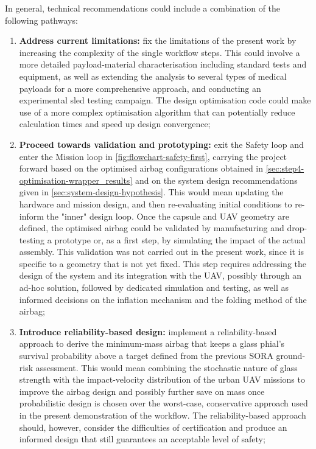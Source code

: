In general, technical recommendations could include a combination of the following pathways:
\begin{enumerate}
    \item \textbf{Address current limitations:} fix the limitations of the present work by increasing the complexity of the single workflow steps. This could involve a more detailed payload-material characterisation including standard tests and equipment, as well as extending the analysis to several types of medical payloads for a more comprehensive approach, and conducting an experimental sled testing campaign. The design optimisation code could make use of a more complex optimisation algorithm that can potentially reduce calculation times and speed up  design convergence;
    
    \item \textbf{Proceed towards validation and prototyping:} exit the Safety loop and enter the Mission loop in \cref{fig:flowchart-safety-first}, carrying the project forward based on the optimised airbag configurations obtained in \cref{sec:step4-optimisation-wrapper_results} and on the system design recommendations given in \cref{sec:system-design-hypothesis}. This would mean updating the hardware and mission design, and then re-evaluating initial conditions to re-inform the "inner" design loop. Once the capsule and UAV geometry are defined, the optimised airbag could be validated by manufacturing and drop-testing a prototype or, as a first step, by simulating the impact of the actual assembly. This validation was not carried out in the present work, since it is specific to a geometry that is not yet fixed. This step requires addressing the design of the system and its integration with the UAV, possibly through an ad-hoc solution, followed by dedicated simulation and testing, as well as informed decisions on the inflation mechanism and the folding method of the airbag;
    
    \item \textbf{Introduce reliability-based design:} implement a reliability-based approach to derive the minimum-mass airbag that keeps a glass phial's survival probability above a target defined from the previous SORA ground-risk assessment. This would mean combining the stochastic nature of glass strength with the impact-velocity distribution of the urban UAV missions to improve the airbag design and possibly further save on mass once probabilistic design is chosen over the worst-case, conservative approach used in the present demonstration of the workflow. The reliability-based approach should, however, consider the difficulties of certification and produce an informed design that still guarantees an acceptable level of safety;
     

\end{enumerate}
